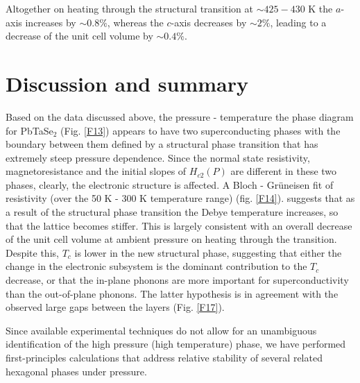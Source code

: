 \documentclass[aps,prb,preprint,groupedaddress,showpacs,amsmath,amssymb]{revtex4}
\begin{document}
Altogether on heating through the structural transition at $\sim 425 - 430$ K  the $a$-axis increases by $\sim 0.8 \%$, whereas the $c$-axis decreases by $\sim 2 \%$, leading to a decrease of the unit cell volume by $\sim 0.4 \%$.

\section{Discussion and summary}

Based on the data discussed above, the pressure - temperature the phase diagram for PbTaSe$_2$ (Fig. \ref{F13})  appears to have two superconducting phases with the boundary between them defined by a structural phase transition that has extremely steep pressure dependence. Since the normal state resistivity, magnetoresistance and the initial slopes of $H_{c2}(P)$ are different in these two phases, clearly, the electronic structure is affected. A Bloch - Gr\"uneisen fit of resistivity (over the 50 K - 300 K temperature range) (fig. \ref{F14}). suggests that as a result of the structural phase transition the Debye temperature increases, so that the lattice becomes stiffer. This is largely consistent with an overall decrease of the unit cell volume at ambient pressure on heating  through the transition. Despite this, $T_c$ is lower in the new structural phase, suggesting that either the change in the electronic subsystem is the dominant contribution to the $T_c$ decrease, or that the  in-plane phonons are more important for superconductivity than the out-of-plane phonons. The latter hypothesis is in agreement with the observed large gaps between the layers (Fig. \ref{F17}).

Since available experimental techniques do not allow for an unambiguous identification of the high pressure (high temperature) phase, we have performed first-principles calculations that address relative stability of several related hexagonal phases under pressure. 
\end{document}
